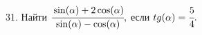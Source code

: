 31. Найти $\cfrac{\sin(\alpha)+2\cos(\alpha)}{\sin(\alpha)-\cos(\alpha)},$ если $tg(\alpha)=\cfrac{5}{4}.$
\newpage
